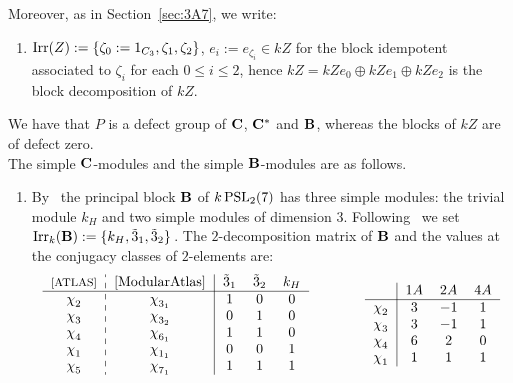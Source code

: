 \begin{nota}
Moreover, as in Section~\ref{sec:3A7}, we write:
\begin{enumerate}[label=(\arabic*), start=10]
    \item\label{nota:blocksOfkZ_3A6}  $\operatorname{Irr}(Z):=\{\zeta_0:=1_{C_3},\zeta_1,\zeta_2\}$, $e_i:=e_{\zeta_i}\in kZ$ for the block idempotent associated to $\zeta_i$ for each $0\leq i\leq 2$, hence  $kZ=kZe_0\oplus kZe_1\oplus kZe_2$ is the block decomposition of $kZ$. 
 \end{enumerate} 
We have that $P$ is a defect group of ${\mathbf{C}}$, ${\mathbf{C}}^\ast$ and ${\mathbf{B}}$, whereas the blocks of $kZ$ are of defect zero.\\ 
The simple ${\mathbf{C}}$-modules and the simple ${\mathbf{B}}$-modules are as follows.
\begin{enumerate}[label=(\arabic*),start=11]
    \item\label{nota:3A6-decompMatrixB} By~\cite[L3(2)mod2]{ModularAtlas} the principal block ${\mathbf{B}}$ of $k\operatorname{PSL}_2(7)$ has three simple modules: the trivial module $k_H$ and two simple modules of dimension $3$.   Following~\cite[L3(2)mod2]{ModularAtlas} we set $\operatorname{Irr}_k({\mathbf{B}}):=\{k_H, \tilde{3}_1,\tilde{3}_2\}$\,.  
    The $2$-decomposition matrix of ${\mathbf{B}}$ and the values at the conjugacy classes of $2$-elements are: 
        \[
        \begin{tabular}{c:c|ccc}{\footnotesize{\cite[p.3]{ATLAS}}} &  \cite{ModularAtlas} & $\tilde{3}_1$ & $\tilde{3}_2$ & $k_H$\\
            \hline  
            $\chi^{}_{2}$ & $\chi^{}_{3_1}$  & $1$ & $0$ & $0$\\
            $\chi^{}_{3}$ & $\chi^{}_{3_2}$ & $0$ & $1$ & $0$\\
            $\chi^{}_{4}$ & $\chi^{}_{6_1}$ & $1$ & $1$ & $0$\\
            $\chi^{}_{1}$ & $\chi^{}_{1_1}$ & $0$ & $0$ & $1$\\
            $\chi^{}_{5}$ & $\chi^{}_{7_1}$ & $1$ & $1$ & $1$\\
        \end{tabular}
        \qquad \qquad
        \begin{tabular}{c|ccc} &  $1A$ & $2A$ & $4A$\\
            \hline  
            $\chi^{}_{2}$ & $3$  & $-1$ & $1$\\
            $\chi^{}_{3}$ & $3$ & $-1$ & $1$\\
            $\chi^{}_{4}$ & $6$ & $2$ & $0$\\
            $\chi^{}_{1}$ & $1$ & $1$ & $1$\\

\end{tabular}\]
\end{enumerate}
\end{nota}
